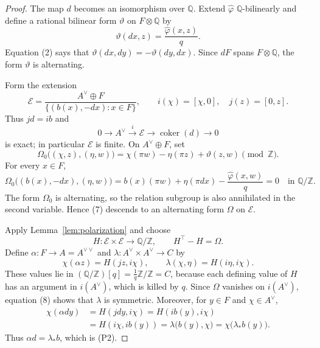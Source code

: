 \documentclass[11pt]{article}
\newcommand{\Z}{\mathbb Z}
\newcommand{\Q}{\mathbb Q}
\theoremstyle{remark}
\begin{document}
\begin{proof}
The map \(d\) becomes an isomorphism over \(\Q\).  Extend
\(\widehat\varphi\) \(\Q\)-bilinearly and define a rational bilinear
form \(\vartheta\) on \(F\otimes\Q\) by
\[
                  \vartheta(dx,z)=\frac{\widehat\varphi(x,z)}q .
                                                                    \tag{4}
\]
Equation (2) says that
\(\vartheta(dx,dy)=-\vartheta(dy,dx)\).  Since \(dF\) spans
\(F\otimes\Q\), the form \(\vartheta\) is alternating.

Form the extension
\[
 \mathcal E=\frac{A^\lor\oplus F}
          {\{(b(x),-dx):x\in F\}},
 \qquad
 i(\chi)=[\chi,0],\quad j(z)=[0,z].
                                                                    \tag{5}
\]
Thus \(jd=ib\) and
\[
                 0\longrightarrow A^\lor
                 \xrightarrow{i}\mathcal E\longrightarrow
                 \operatorname{coker}(d)
                 \longrightarrow0
                                                                    \tag{6}
\]
is exact; in particular \(\mathcal E\) is finite.  On
\(A^\lor\oplus F\), set
\[
\Omega_0\bigl((\chi,z),(\eta,w)\bigr)
 =\chi(\pi w)-\eta(\pi z)+\vartheta(z,w)\pmod{\Z}.             \tag{7}
\]
For every \(x\in F\),
\[
\Omega_0\bigl((b(x),-dx),(\eta,w)\bigr)
 =b(x)(\pi w)+\eta(\pi dx)
  -\frac{\widehat\varphi(x,w)}q=0
 \quad\text{in }\Q/\Z.
\]
The form \(\Omega_0\) is alternating, so the relation subgroup is
also annihilated in the second variable.  Hence (7) descends to an
alternating form \(\Omega\) on \(\mathcal E\).

Apply Lemma~\ref{lem:polarization} and choose
\[
                   H:\mathcal E\times\mathcal E\longrightarrow\Q/\Z,
                   \qquad H^\top-H=\Omega .                  \tag{8}
\]
Define \(\alpha:F\to A=A^{\lor\lor}\) and
\(\lambda:A^\lor\times A^\lor\to C\) by
\[
\boxed{\quad
 \chi(\alpha z)=H(jz,i\chi),\qquad
 \lambda(\chi,\eta)=H(i\eta,i\chi).
\quad}                                                        \tag{9}
\]
These values lie in
\((\Q/\Z)[q]=\frac1q\Z/\Z=C\), because each defining value of \(H\)
has an argument in \(i(A^\lor)\), which is killed by \(q\).  Since
\(\Omega\) vanishes on
\(i(A^\lor)\), equation (8) shows that \(\lambda\) is symmetric.
Moreover, for \(y\in F\) and \(\chi\in A^\lor\),
\[
\begin{aligned}
 \chi(\alpha dy)
 &=H(jdy,i\chi)
  =H(ib(y),i\chi)\\
 &=H(i\chi,ib(y))
  =\lambda\bigl(b(y),\chi\bigr)
  =\chi\bigl(\lambda_*b(y)\bigr).
\end{aligned}
\]
Thus \(\alpha d=\lambda_*b\), which is (P2).


\end{proof}
\end{document}
